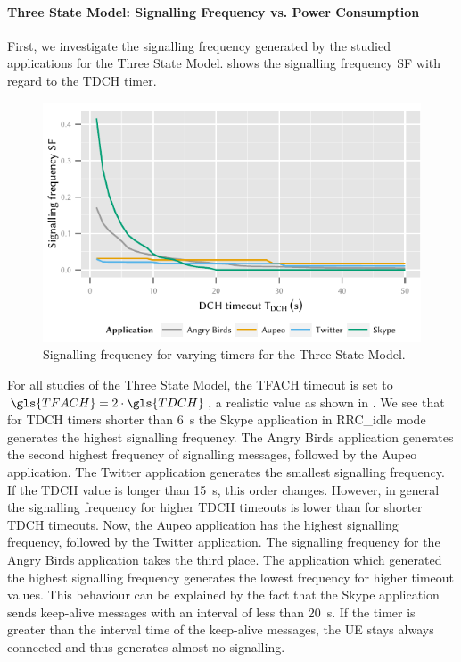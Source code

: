 \paragraph*{Three State Model: Signalling Frequency vs. Power Consumption}\label{sec:network:network_traces:numerical_results:three_states}
First, we investigate the signalling frequency generated by the studied applications for the Three State Model. 
 shows the signalling frequency \gls{SF} with regard to the \gls{TDCH} timer.
\begin{figure}
	\centering
	\includegraphics{network/network_traces/numerical_results/figures/3_state_tdch_vs_frequency}
	\caption{Signalling frequency  for varying  timers for the Three State Model.}\label{fig:network:network_traces:numerical_results:three_states:three_states:signalling}
\end{figure}
For all studies of the Three State Model, the \gls{TFACH} timeout is set to \(\gls{TFACH} = 2\cdot  \gls{TDCH}\), a realistic value as shown in \cite{Qian2011a}.
We see that for \gls{TDCH} timers shorter than \SI{6}{\second} the Skype application in \gls{RRC_idle} mode generates the highest signalling frequency.
The Angry Birds application generates the second highest frequency of signalling messages, followed by the Aupeo application.
The Twitter application generates the smallest signalling frequency.
If the \gls{TDCH} value is longer than \SI{15}{\second}, this order changes.
However, in general the signalling frequency for higher \gls{TDCH} timeouts is lower than for shorter \gls{TDCH} timeouts.
Now, the Aupeo application has the highest signalling frequency, followed by the Twitter application.
The signalling frequency for the Angry Birds application takes the third place.
The application which generated the highest signalling frequency generates the lowest frequency for higher timeout values.
This behaviour can be explained by the fact that the Skype application sends keep-alive messages with an interval of less than \SI{20}{\second}.
If the timer is greater than the interval time of the keep-alive messages, the \gls{UE} stays always connected and thus generates almost no signalling.

